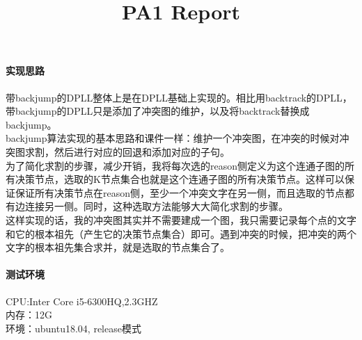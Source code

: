 \documentclass[11pt,a4paper]{article}
\title{PA1 Report}
\begin{document}
\maketitle
\paragraph{实现思路}
带backjump的DPLL整体上是在DPLL基础上实现的。相比用backtrack的DPLL，带backjump的DPLL只是添加了冲突图的维护，以及将backtrack替换成backjump。\\
backjump算法实现的基本思路和课件一样：维护一个冲突图，在冲突的时候对冲突图求割，然后进行对应的回退和添加对应的子句。\\
为了简化求割的步骤，减少开销，我将每次选的reason侧定义为这个连通子图的所有决策节点，选取的K节点集合也就是这个连通子图的所有决策节点。这样可以保证保证所有决策节点在reason侧，至少一个冲突文字在另一侧，而且选取的节点都有边连接另一侧。同时，这种选取方法能够大大简化求割的步骤。\\
这样实现的话，我的冲突图其实并不需要建成一个图，我只需要记录每个点的文字和它的根本祖先（产生它的决策节点集合）即可。遇到冲突的时候，把冲突的两个文字的根本祖先集合求并，就是选取的节点集合了。\\
\paragraph{测试环境}
CPU:Inter Core i5-6300HQ,2.3GHZ\\
内存：12G\\
环境：ubuntu18.04, release模式
\end{document}

